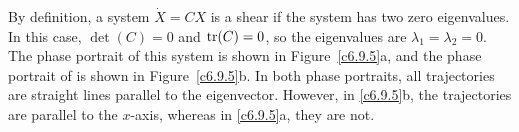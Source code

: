 \documentclass{ximera}
\begin{document}
\begin{figure}[htb]
                       \centerline{%
                       }
\end{figure}

By definition, a system $\dot{X} = CX$ is a shear if the system has two
zero eigenvalues.  In this case, $\det(C) = 0$ and ${\rm tr}(C) = 0$, so
the eigenvalues are $\lambda_1 = \lambda_2 = 0$.  The phase portrait of
this system is shown in Figure~\ref{c6.9.5}a, and the phase portrait of
 is shown in Figure~\ref{c6.9.5}b.  In both phase portraits,
all trajectories are straight lines parallel to the eigenvector.  However,
in \ref{c6.9.5}b, the trajectories are parallel to the $x$-axis, whereas
in \ref{c6.9.5}a, they are not.

\begin{figure}[htb]
                       \centerline{%
                       }
\end{figure}
\end{document}
